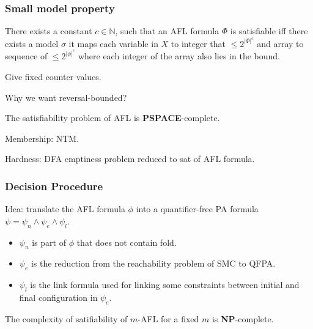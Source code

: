 \documentclass[11pt]{beamer}
\begin{document}
\begin{frame}\frametitle{Small model property}
\begin{lemma}
There exists a constant $c\in \mathbb{N}$, such that an AFL formula $\Phi$ is satisfiable iff there exists a model $\sigma$ it maps each variable in $X$ to integer that $\le 2^{|\Phi|^c}$ and array to sequence of $\le 2^{|\phi|^c}$ where each integer of the array also lies in the bound.
\end{lemma}

Give fixed counter values.

Why we want reversal-bounded?

\begin{theorem}
The satisfiability problem of AFL is \textbf{PSPACE}-complete.

\end{theorem}
Membership: NTM.

Hardness: DFA emptiness problem reduced to sat of AFL formula.

\end{frame}

\begin{frame}\frametitle{Decision Procedure}
Idea: translate the AFL formula $\phi$ into a quantifier-free PA formula $\psi = \psi_n \wedge \psi_e \wedge \psi_l$.

\begin{itemize}
\item $\psi_n$ is part of $\phi$ that does not contain fold.
\item $\psi_e$ is the reduction from the reachability problem of SMC to QFPA.
\item $\psi_l$ is the link formula used for linking some constraints between initial and final configuration in $\psi_e$.
\end{itemize}

\begin{lemma}
The complexity of satifiability of $m$-AFL for a fixed $m$ is \textbf{NP}-complete.
\end{lemma}

\end{frame}
\end{document}

